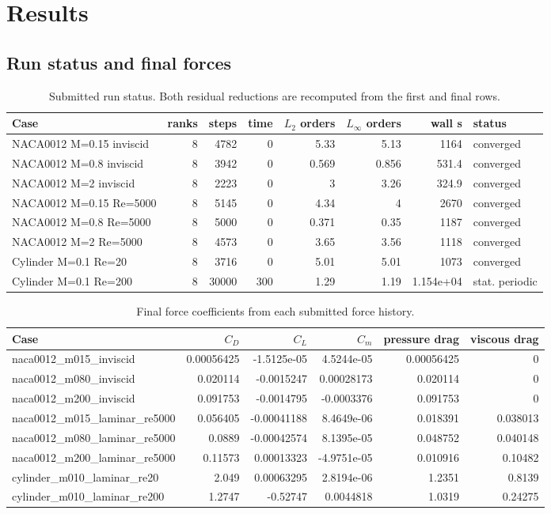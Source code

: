 \documentclass[11pt]{article}
\begin{document}
\section{Results}
\subsection{Run status and final forces}
\begin{table}[htbp]\centering\scriptsize
\caption{Submitted run status.  Both residual reductions are recomputed from the first and final rows.}\label{tab:status}
\begin{tabular}{lrrrrrrl}\toprule Case & ranks & steps & time & $L_2$ orders & $L_\infty$ orders & wall s & status\\\midrule
NACA0012 M=0.15 inviscid & 8 & 4782 & 0 & 5.33 & 5.13 & 1164 & converged \\
NACA0012 M=0.8 inviscid & 8 & 3942 & 0 & 0.569 & 0.856 & 531.4 & converged \\
NACA0012 M=2 inviscid & 8 & 2223 & 0 & 3 & 3.26 & 324.9 & converged \\
NACA0012 M=0.15 Re=5000 & 8 & 5145 & 0 & 4.34 & 4 & 2670 & converged \\
NACA0012 M=0.8 Re=5000 & 8 & 5000 & 0 & 0.371 & 0.35 & 1187 & converged \\
NACA0012 M=2 Re=5000 & 8 & 4573 & 0 & 3.65 & 3.56 & 1118 & converged \\
Cylinder M=0.1 Re=20 & 8 & 3716 & 0 & 5.01 & 5.01 & 1073 & converged \\
Cylinder M=0.1 Re=200 & 8 & 30000 & 300 & 1.29 & 1.19 & 1.154e+04 & stat. periodic \\
\bottomrule\end{tabular}\end{table}
\begin{table}[htbp]\centering\small
\caption{Final force coefficients from each submitted force history.}\label{tab:forces}
\begin{tabular}{lrrrrr}\toprule Case & $C_D$ & $C_L$ & $C_m$ & pressure drag & viscous drag\\\midrule
naca0012\_m015\_inviscid & 0.00056425 & -1.5125e-05 & 4.5244e-05 & 0.00056425 & 0 \\
naca0012\_m080\_inviscid & 0.020114 & -0.0015247 & 0.00028173 & 0.020114 & 0 \\
naca0012\_m200\_inviscid & 0.091753 & -0.0014795 & -0.0003376 & 0.091753 & 0 \\
naca0012\_m015\_laminar\_re5000 & 0.056405 & -0.00041188 & 8.4649e-06 & 0.018391 & 0.038013 \\
naca0012\_m080\_laminar\_re5000 & 0.0889 & -0.00042574 & 8.1395e-05 & 0.048752 & 0.040148 \\
naca0012\_m200\_laminar\_re5000 & 0.11573 & 0.00013323 & -4.9751e-05 & 0.010916 & 0.10482 \\
cylinder\_m010\_laminar\_re20 & 2.049 & 0.00063295 & 2.8194e-06 & 1.2351 & 0.8139 \\
cylinder\_m010\_laminar\_re200 & 1.2747 & -0.52747 & 0.0044818 & 1.0319 & 0.24275 \\
\bottomrule\end{tabular}\end{table}
\end{document}
